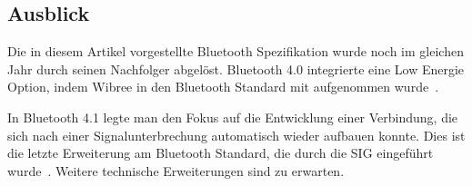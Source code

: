 \begin{multicols}{3}
\subsection*{Ausblick}
Die in diesem Artikel vorgestellte Bluetooth Spezifikation wurde noch im gleichen Jahr durch seinen Nachfolger abgelöst. Bluetooth 4.0 integrierte eine Low Energie Option, indem Wibree in den Bluetooth Standard mit aufgenommen wurde~\cite{bluetooth3.0.1}. 

In Bluetooth 4.1 legte man den Fokus auf die Entwicklung einer Verbindung, die sich nach einer Signalunterbrechung automatisch wieder aufbauen konnte. Dies ist die letzte Erweiterung am Bluetooth Standard, die durch die SIG eingeführt wurde~\cite{bluetooth3.0.1}. Weitere technische Erweiterungen sind zu erwarten. 

\printbibliography[segment=2,heading=subbibliography]

\end{multicols}
\newpage
